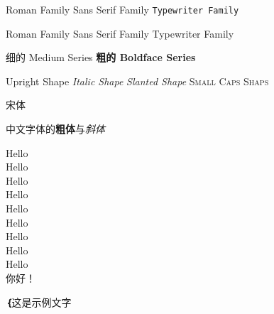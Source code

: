 \documentclass[12pt]{article}
\newcommand{\myfont}{\textbf\textsf｛{}}
\begin{document}
	\textrm{Roman Family} \textsf{Sans Serif Family} \texttt{Typewriter Family}  
	
	\rmfamily Roman Family {\sffamily Sans Serif Family} {\ttfamily Typewriter Family}
	
	\textmd{细的 Medium Series}
	\textbf{粗的 Boldface Series}
	
	\textup{Upright Shape}
	\textit{Italic Shape}
	\textsl{Slanted Shape}
	\textsc{Small Caps Shaps}
	
	{\songti 宋体}   
	
	中文字体的\textbf{粗体}与\textit{斜体}
	
   	{\tiny Hello}\\
	{\scriptsize  Hello}\\
	{\footnotesize Hello}\\
	{\small Hello}\\
	{\normalsize Hello}\\
	{\large Hello}\\
	{\LARGE Hello}\\
	{\huge Hello}\\
	{\Huge Hello}\\
	
	 你好！
	
	\myfont 这是示例文字
	
		
\end{document}
